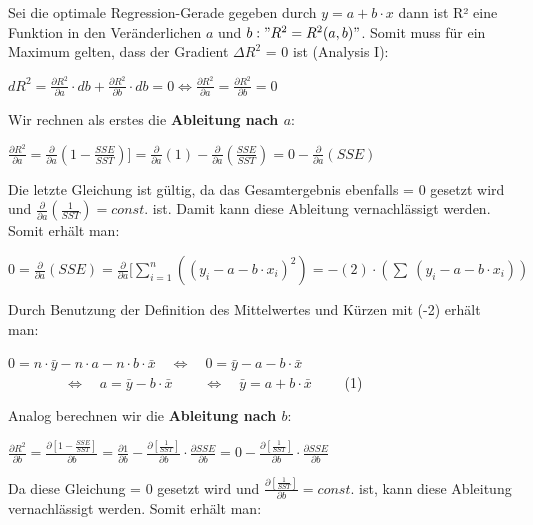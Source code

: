 \documentclass[12pt]{article}
\begin{document}
Sei die optimale Regression-Gerade gegeben durch $ y = a + b \cdot x $ dann ist R² eine Funktion in den Veränderlichen $a$ und $ b: " R^2 = R^2(a,b)" $. Somit muss für ein Maximum gelten, dass der Gradient $\Delta{R^2}$ = 0 ist (Analysis I): 
\begin{center}
\begin{large} 
$  dR^2 = \frac{\partial R^2}{\partial a} \cdot db + \frac{\partial R^2}{\partial b} \cdot db = 0 \Longleftrightarrow  \frac{\partial R^2}{\partial a} = \frac{\partial R^2}{\partial b} = 0 $
\end{large}
\end{center}
%
Wir rechnen als erstes die \textbf{Ableitung nach $a$}:
% 
\begin{center}
\begin{large} 
$ \frac{\partial R^2}{\partial a} = \frac{\partial}{\partial a}(1 - \frac {SSE}{SST})]  =  \frac{\partial}{\partial a}(1) - \frac{\partial}{\partial a}(\frac{SSE}{SST})= 0 -  \frac{\partial}{\partial a}(SSE) $ 
\end{large}
\end{center}
% 
Die letzte Gleichung ist gültig, da das Gesamtergebnis ebenfalls = 0 gesetzt wird und $ \frac{\partial}{\partial a}(\frac{1}{SST}) = const. $ ist. Damit kann diese Ableitung vernachlässigt werden. Somit erhält man: \\ 

\begin{center}
\begin{large} 
$ 0 = \frac{\partial}{\partial a}(SSE) = \frac{\partial}{\partial a}[\sum\limits_{i=1}^n {((y_i - a -b \cdot x_i)^2)} = -(2) \cdot (\sum\ (y_i - a - b \cdot  x_i)) $
\end{large}
\end{center}
%
Durch Benutzung der Definition des Mittelwertes und Kürzen mit (-2) erhält man: 

\begin{center}
$ 0 = n \cdot \bar{y} - n \cdot a -n \cdot b \cdot \bar{x} \quad \Leftrightarrow \quad 0 = \bar{y} - a  -b \cdot \bar{x}$ \\[0.2cm] 
$ \qquad \qquad \Leftrightarrow \quad a = \bar{y} -b \cdot \bar{x} \qquad\ \Leftrightarrow \quad \bar{y} = a +  b \cdot \bar{x} \qquad $ (1)
\end{center}

Analog berechnen wir die \textbf{Ableitung nach $b$}:
 
\begin{center}
\begin{large} 
$ \frac{\partial R^2}{\partial b} = \frac{\partial [ 1 - \frac {SSE}{SST}]}{\partial b} =  \frac{\partial 1}{\partial b} - \frac{\partial [\frac{1}{SST}]}{\partial b} \cdot \frac{\partial SSE}{\partial b} = 0 -  \frac{\partial [\frac{1}{SST}]}{\partial b} \cdot \frac{\partial SSE}{\partial b} $ 
\end{large}
\end{center}
% 
Da diese Gleichung = 0 gesetzt wird und $ \frac{\partial [\frac{1}{SST}]}{\partial b} = const. $ ist, kann diese Ableitung vernachlässigt werden. Somit erhält man: 
\end{document}
